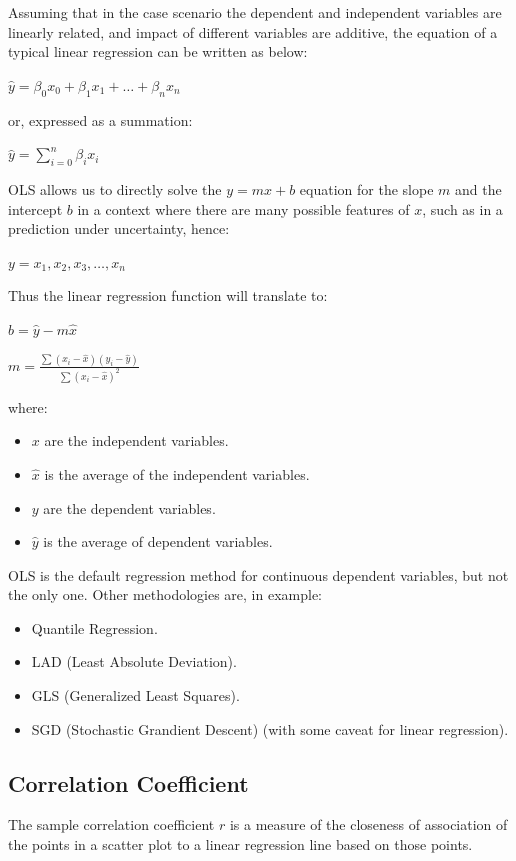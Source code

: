 \documentclass{article}
\begin{document}
Assuming that in the case scenario the dependent and independent variables are linearly related, and impact of different variables are additive, the equation of a typical linear regression can be written as below:

$\hat{y} = \beta_0 x_0 + \beta_1 x_1 + \ldots + \beta_n x_n$

or, expressed as a summation:

$ \displaystyle \hat{y} = \sum \limits^{n}_{i=0}{\beta_i x_i}$

OLS allows us to directly solve the $y = mx + b$ equation for the slope $m$ and the intercept $b$ in a context where there are many possible features of $x$, such as in a prediction under uncertainty, hence:

$ \displaystyle {y = x_1, x_2, x_3, \ldots, x_n}$

Thus the linear regression function will translate to:

$b = \hat{y} - m\hat{x}$

$m = \displaystyle \frac{\sum(x_i - \hat{x})(y_i - \hat{y})}{\sum(x_i - \hat{x})^2}$

where:
\begin{itemize}
    \item $x$ are the independent variables.
    \item $\hat{x}$ is the average of the independent variables.
    \item $y$ are the dependent variables.
    \item $\hat{y}$ is the average of dependent variables.
\end{itemize}


OLS is the default regression method for continuous dependent variables, but not the only one.
Other methodologies are, in example:
\begin{itemize}
    \item Quantile Regression.
    \item LAD (Least Absolute Deviation).
    \item GLS (Generalized Least Squares).
    \item SGD (Stochastic Grandient Descent) (with some caveat for linear regression).
\end{itemize}

\subsection{Correlation Coefficient}
The sample correlation coefficient $r$ is a measure of the closeness of association of the points in a scatter plot to a linear regression line based on those points.
\end{document}
